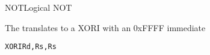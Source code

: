 \begin{instruction}{NOT}{Logical NOT}
\begin{remarks}
The translates to a XORI with an 0xFFFF immediate 
\begin{alltt}
    XORI Rd, Rs, Rs
\end{alltt}
\end{remarks}
\end{instruction}
